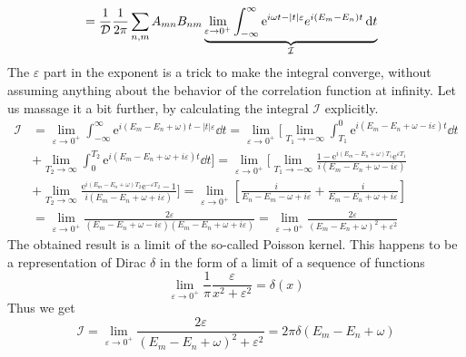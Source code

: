 {\begin{align}
                                         & = \frac{1}{\mathcal{D}} \frac{1}{2 \pi}\sum_{n,m} A_{mn} B_{nm}  \underbrace{\lim _{\varepsilon
        \to 0^+} \int_{-\infty}^{\infty} \mathrm{e}^{i \omega t-\vert t \vert
        \varepsilon}e^{i (E_m-E_n) t}\dd{t} }_{\mathcal{I}}\label{eq:spectral function simplified}
\end{align}
The \(\varepsilon \) part in the exponent is a trick to make the integral converge, without assuming anything
about the behavior of the correlation function at infinity.
Let us massage it a bit further, by calculating the integral \(\mathcal{I}\) explicitly.
\begin{align}
    \mathcal{I} & = \lim _{\varepsilon \to 0^+} \int_{-\infty}^{\infty}
    \mathrm{e}^{ i (E_m-E_n+\omega)t -|t| \varepsilon}\dd{t}  = \lim _{\varepsilon \to 0^+}
    \Bigg[\lim_{T_1\to -\infty}\int_{T_1}^{0}  \mathrm{e}^{ i (E_m-E_n+\omega -i \varepsilon)t}\dd{t} \nonumber                 \\
                & +\lim_{T_2\to \infty}\int_{0}^{T_2}  \mathrm{e}^{ i (E_m-E_n+\omega + i\varepsilon)t}\dd{t} \Bigg]
    = \lim _{\varepsilon \to 0^+} \Bigg[\lim_{T_1\to -\infty}
    \frac{1-\mathrm{e}^{ i (E_m-E_n+\omega )T_1} \mathrm{e}^{\varepsilon T_1}}{i (E_m-E_n+\omega -i \varepsilon)}\nonumber \\
                & + \lim_{T_2\to \infty} \frac{\mathrm{e}^{ i (E_m-E_n+\omega )T_2} \mathrm{e}^{-\varepsilon T_2}-1}
    {i (E_m-E_n+\omega +i \varepsilon)}\Bigg]
    = \lim _{\varepsilon \to 0^+} \left[\frac{i}{E_n-E_m-\omega +i \varepsilon} +
    \frac{i}{E_m-E_n+\omega +i \varepsilon} \right]\nonumber                                                           \\
                & = \lim _{\varepsilon \to 0^+}
    \frac{2\varepsilon}{(E_m-E_n+\omega -i \varepsilon)(E_m-E_n+\omega +i \varepsilon)}
    =\lim _{\varepsilon \to 0^+} \frac{2\varepsilon}{(E_m-E_n+\omega)^2 +\varepsilon^2}
\end{align}}
The obtained result is a limit of the so-called Poisson kernel. This happens to be
a representation of Dirac \(\delta\) in the form of a limit of a sequence of functions~\autocite{Byron1992}
\begin{equation}
    \lim _{\varepsilon \to 0^+} \frac{1}{\pi} \frac{\varepsilon}{x^2 +\varepsilon^2} = \delta(x)
\end{equation}
Thus we get
\begin{equation}
    \mathcal{I} = \lim _{\varepsilon \to 0^+} \frac{2\varepsilon}{(E_m-E_n+\omega)^2 +\varepsilon^2}
    = 2\pi \delta(E_m-E_n+\omega)
\end{equation}
